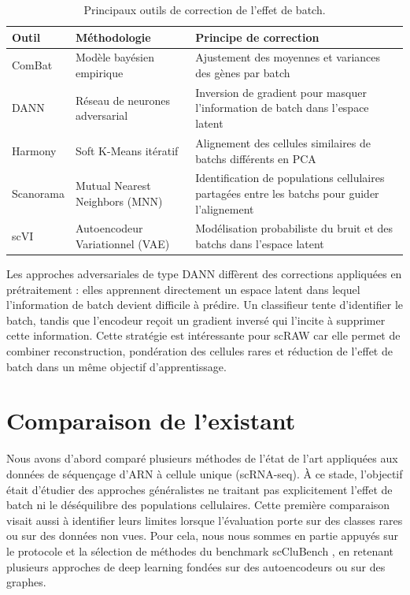 \begin{table}[htbp]
\centering
\renewcommand{\arraystretch}{1.3}
\begin{tabularx}{\textwidth}{l l X}
\toprule
\textbf{Outil} & \textbf{Méthodologie} & \textbf{Principe de correction} \\
\midrule
ComBat \cite{johnson2007adjusting} & Modèle bayésien empirique & Ajustement des moyennes et variances des gènes par batch \\
DANN \cite{ganin2016domain} & Réseau de neurones adversarial & Inversion de gradient pour masquer l'information de batch dans l'espace latent \\
Harmony \cite{korsunsky2019fast} & Soft K-Means itératif & Alignement des cellules similaires de batchs différents en PCA \\
Scanorama \cite{Hie2019} & Mutual Nearest Neighbors (MNN) & Identification de populations cellulaires partagées entre les batchs pour guider l'alignement \\
scVI \cite{Lopez2018scVI} & Autoencodeur Variationnel (VAE) & Modélisation probabiliste du bruit et des batchs dans l'espace latent \\
\bottomrule
\end{tabularx}
\caption[Principaux outils de correction de l'effet de batch.]{Principaux outils de correction de l'effet de batch.}
\label{tab:batch_correction}
\end{table}

Les approches adversariales de type DANN diffèrent des corrections appliquées en prétraitement : elles apprennent directement un espace latent dans lequel l'information de batch devient difficile à prédire. Un classifieur tente d'identifier le batch, tandis que l'encodeur reçoit un gradient inversé qui l'incite à supprimer cette information. Cette stratégie est intéressante pour scRAW car elle permet de combiner reconstruction, pondération des cellules rares et réduction de l'effet de batch dans un même objectif d'apprentissage.

\section{Comparaison de l'existant}

Nous avons d'abord comparé plusieurs méthodes de l'état de l'art appliquées aux données de séquençage d'ARN à cellule unique (scRNA-seq). À ce stade, l'objectif était d'étudier des approches généralistes ne traitant pas explicitement l'effet de batch ni le déséquilibre des populations cellulaires. Cette première comparaison visait aussi à identifier leurs limites lorsque l'évaluation porte sur des classes rares ou sur des données non vues. Pour cela, nous nous sommes en partie appuyés sur le protocole et la sélection de méthodes du benchmark scCluBench \cite{xu_scclubench_2026}, en retenant plusieurs approches de deep learning fondées sur des autoencodeurs ou sur des graphes.


